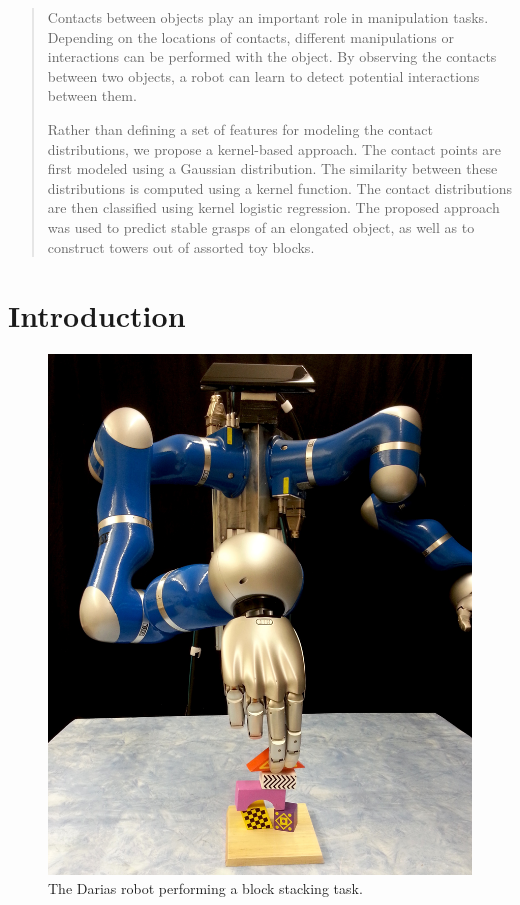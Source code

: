 \begin{abstract}
Contacts between objects play an important role in manipulation tasks.
Depending on the locations of contacts, different manipulations or
interactions can be performed with the object. By observing the contacts
between two objects, a robot can learn to detect potential interactions
between them. 

Rather than defining a set of features for modeling the contact distributions,
we propose a kernel-based approach. The contact points are first
modeled using a Gaussian distribution. The similarity between these
distributions is computed using a kernel function. The contact distributions
are then classified using kernel logistic regression. The proposed
approach was used to predict stable grasps of an elongated object,
as well as to construct towers out of assorted toy blocks. 
\end{abstract}

\section{Introduction}

\begin{figure}
	\centering
	\includegraphics[width=.99\linewidth]{oli/PicsforIROS2014/RobotStacking}
	\caption{\label{fig:The-Darias-robot}The Darias robot performing a block stacking
task.}
	\figspace
\end{figure}

